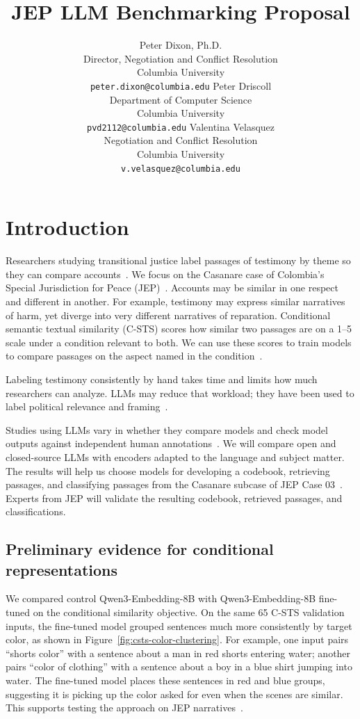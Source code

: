 \documentclass{article}
\title{JEP LLM Benchmarking Proposal}
\author{%
  Peter Dixon, Ph.D. \\
  Director, Negotiation and Conflict Resolution \\
  Columbia University \\
  \texttt{peter.dixon@columbia.edu}
  \And
  Peter Driscoll \\
  Department of Computer Science \\
  Columbia University \\
  \texttt{pvd2112@columbia.edu}
  \And
  Valentina Velasquez \\
  Negotiation and Conflict Resolution \\
  Columbia University \\
  \texttt{v.velasquez@columbia.edu}
}
\begin{document}
\raggedbottom
\maketitle

\section{Introduction}
Researchers studying transitional justice label passages of testimony by theme so they can compare accounts~\cite{Schirmer2025}. We focus on the Casanare case of Colombia's Special Jurisdiction for Peace (JEP)~\cite{JEPCaso03}. Accounts may be similar in one respect and different in another. For example, testimony may express similar narratives of harm, yet diverge into very different narratives of reparation. Conditional semantic textual similarity (C-STS) scores how similar two passages are on a 1--5 scale under a condition relevant to both. We can use these scores to train models to compare passages on the aspect named in the condition~\cite{C-STS}.

Labeling testimony consistently by hand takes time and limits how much researchers can analyze. LLMs may reduce that workload; they have been used to label political relevance and framing~\cite{Gilardi2023}.

Studies using LLMs vary in whether they compare models and check model outputs against independent human annotations~\cite{Desai2026}. We will compare open and closed-source LLMs with encoders adapted to the language and subject matter. The results will help us choose models for developing a codebook, retrieving passages, and classifying passages from the Casanare subcase of JEP Case 03~\cite{JEPCaso03}. Experts from JEP will validate the resulting codebook, retrieved passages, and classifications.

\subsection{Preliminary evidence for conditional representations}
We compared control Qwen3-Embedding-8B with Qwen3-Embedding-8B fine-tuned on the conditional similarity objective. On the same 65 C-STS validation inputs, the fine-tuned model grouped sentences much more consistently by target color, as shown in Figure~\ref{fig:csts-color-clustering}. For example, one input pairs ``shorts color'' with a sentence about a man in red shorts entering water; another pairs ``color of clothing'' with a sentence about a boy in a blue shirt jumping into water. The fine-tuned model places these sentences in red and blue groups, suggesting it is picking up the color asked for even when the scenes are similar. This supports testing the approach on JEP narratives~\cite{CSTSColorClustering}.
\end{document}
